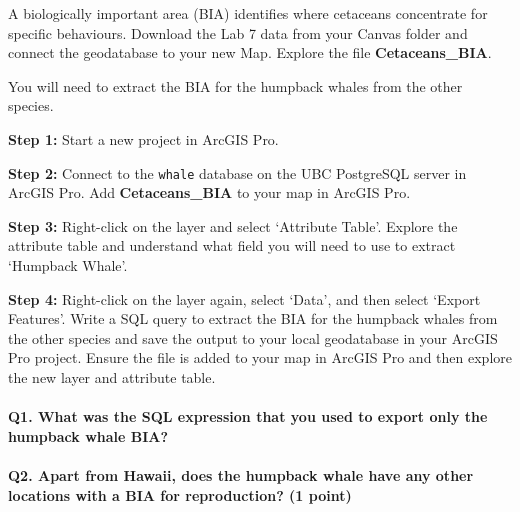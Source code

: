 \documentclass[
]{book}
\begin{document}
A biologically important area (BIA) identifies where cetaceans concentrate for specific behaviours. Download the Lab 7 data from your Canvas folder and connect the geodatabase to your new Map. Explore the file \textbf{Cetaceans\_BIA}.

You will need to extract the BIA for the humpback whales from the other species.

\textbf{Step 1:} Start a new project in ArcGIS Pro.

\textbf{Step 2:} Connect to the \texttt{whale} database on the UBC PostgreSQL server in ArcGIS Pro. Add \textbf{Cetaceans\_BIA} to your map in ArcGIS Pro.

\textbf{Step 3:} Right-click on the layer and select `Attribute Table'. Explore the attribute table and understand what field you will need to use to extract `Humpback Whale'.

\textbf{Step 4:} Right-click on the layer again, select `Data', and then select `Export Features'. Write a SQL query to extract the BIA for the humpback whales from the other species and save the output to your local geodatabase in your ArcGIS Pro project. Ensure the file is added to your map in ArcGIS Pro and then explore the new layer and attribute table.

\hypertarget{q1.-what-was-the-sql-expression-that-you-used-to-export-only-the-humpback-whale-bia}{%
\paragraph*{Q1. What was the SQL expression that you used to export only the humpback whale BIA?}\label{q1.-what-was-the-sql-expression-that-you-used-to-export-only-the-humpback-whale-bia}}

\hypertarget{q2.-apart-from-hawaii-does-the-humpback-whale-have-any-other-locations-with-a-bia-for-reproduction-1-point}{%
\paragraph*{Q2. Apart from Hawaii, does the humpback whale have any other locations with a BIA for reproduction? (1 point)}\label{q2.-apart-from-hawaii-does-the-humpback-whale-have-any-other-locations-with-a-bia-for-reproduction-1-point}}
\end{document}
